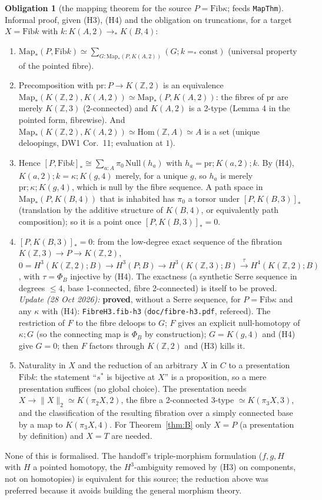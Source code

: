 \documentclass[11pt]{amsart}
\theoremstyle{definition}
\newtheorem{obligation}[theorem]{Obligation}
\theoremstyle{remark}
\newcommand{\Map}{\mathrm{Map}_*}
\newcommand{\Hom}{\mathrm{Hom}}
\newcommand{\Fib}{\mathrm{Fib}}
\newcommand{\Z}{\mathbb{Z}}
\newcommand{\tr}[2]{\|#1\|_{#2}}
\newcommand{\hc}[2]{[#1,#2]_*}
\newcommand{\code}[1]{\texttt{#1}}
\begin{document}
\begin{obligation}[the mapping theorem for the source $P=\Fib\kappa$; feeds \code{MapThm}]
Informal proof, given (H3), (H4) and the obligation on truncations, for a
target $X=\Fib k$ with $k:K(A,2)\to_*K(B,4)$:
\begin{enumerate}
\item $\Map(P,\Fib k)\simeq\sum_{G:\Map(P,K(A,2))}(G;k=_*\mathrm{const})$
  (universal property of the pointed fibre).
\item Precomposition with $\mathrm{pr}:P\to K(\Z,2)$ is an equivalence
  $\Map(K(\Z,2),K(A,2))\simeq\Map(P,K(A,2))$: the fibres of $\mathrm{pr}$
  are merely $K(\Z,3)$ (2-connected) and $K(A,2)$ is a 2-type (Lemma 4 in
  the pointed form, fibrewise). And $\Map(K(\Z,2),K(A,2))\simeq\Hom(\Z,A)
  \simeq A$ is a set (unique deloopings, DW1 Cor.~11; evaluation at $1$).
\item Hence $\hc P{\Fib k}\cong\sum_{a:A}\pi_0\,\mathrm{Null}(h_a)$ with
  $h_a=\mathrm{pr};K(a,2);k$. By (H4), $K(a,2);k=\kappa;K(g,4)$ merely,
  for a unique $g$, so $h_a$ is merely $\mathrm{pr};\kappa;K(g,4)$, which
  is null by the fibre sequence. A path space in
  $\Map(P,K(B,4))$ that is inhabited has $\pi_0$ a torsor under
  $\hc P{K(B,3)}$ (translation by the additive structure of
  $K(B,4)$, or equivalently path composition); so it is a point once
  $\hc P{K(B,3)}=0$.
\item $\hc P{K(B,3)}=0$: from the low-degree exact sequence of the
  fibration $K(\Z,3)\to P\to K(\Z,2)$,
  $0=H^3(K(\Z,2);B)\to H^3(P;B)\to H^3(K(\Z,3);B)\xrightarrow{\tau}
  H^4(K(\Z,2);B)$, with $\tau=\Phi_B$ injective by (H4). The exactness
  (a synthetic Serre sequence in degrees $\le4$, base 1-connected, fibre
  2-connected) is itself to be proved. \emph{Update (28 Oct 2026):}
  \textbf{proved}, without a Serre sequence, for $P=\Fib\kappa$ and any
  $\kappa$ with (H4): \code{FibreH3.fib-h3}
  (\code{doc/fibre-h3.pdf}, refereed). The restriction of $F$ to the fibre
  deloops to $G$; $F$ gives an explicit null-homotopy of $\kappa;G$ (so
  the connecting map is $\Phi_B$ by construction); $G=K(g,4)$ and (H4)
  give $G=0$; then $F$ factors through $K(\Z,2)$ and (H3) kills it.
\item Naturality in $X$ and the reduction of an arbitrary $X$ in $C$ to a
  presentation $\Fib k$: the statement ``$s^*$ is bijective at $X$'' is a
  proposition, so a mere presentation suffices (no global choice). The
  presentation needs $X\to\tr X2\simeq K(\pi_2X,2)$, the fibre a
  2-connected 3-type $\simeq K(\pi_3X,3)$, and the classification of the
  resulting fibration over a simply connected base by a map to
  $K(\pi_3X,4)$. For Theorem~\ref{thm:B} only $X=P$ (a presentation by
  definition) and $X=T$ are needed.
\end{enumerate}
None of this is formalised. The handoff's triple-morphism formulation
($f,g,H$ with $H$ a pointed homotopy, the $H^3$-ambiguity removed by (H3)
on components, not on homotopies) is equivalent for this source; the
reduction above was preferred because it avoids building the general
morphism theory.
\end{obligation}
\end{document}
